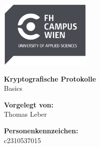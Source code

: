 \begin{titlepage}
  \sffamily
  \includegraphics[width=4.5cm]{figures/FH_Campus_Wien_Logo.pdf}

  \center
  \large

  \vspace{-0.5cm}

  {\LARGE \textbf{Kryptografische Protokolle\\}}
  \vspace{0.2em}
  Basics

  \vspace{0.7cm}

  \textbf{Vorgelegt von:} \\
  \vspace{0.2cm}
  Thomas Leber \\

  \vspace{0.7cm}

  \textbf{Personenkennzeichen:}\\
  \vspace{0.2cm}
  c2310537015 \\

  \vspace{0.7cm}

\end{titlepage}
